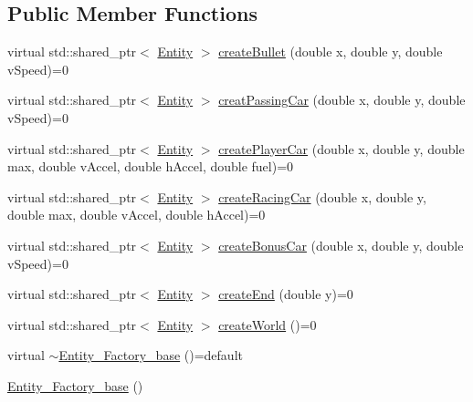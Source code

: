 \subsection*{Public Member Functions}
\begin{DoxyCompactItemize}
\item 
virtual std\+::shared\+\_\+ptr$<$ \hyperlink{classroadfighter_1_1Entity}{Entity} $>$ \hyperlink{classroadfighter_1_1Entity__Factory__base_a5241bdb886a9f1b086d009a0f6478045}{create\+Bullet} (double x, double y, double v\+Speed)=0
\item 
virtual std\+::shared\+\_\+ptr$<$ \hyperlink{classroadfighter_1_1Entity}{Entity} $>$ \hyperlink{classroadfighter_1_1Entity__Factory__base_aa21b8cb23696844b7349ccf2c87d10fa}{creat\+Passing\+Car} (double x, double y, double v\+Speed)=0
\item 
virtual std\+::shared\+\_\+ptr$<$ \hyperlink{classroadfighter_1_1Entity}{Entity} $>$ \hyperlink{classroadfighter_1_1Entity__Factory__base_a3021f69b62b9df33706096381664d58f}{create\+Player\+Car} (double x, double y, double max, double v\+Accel, double h\+Accel, double fuel)=0
\item 
virtual std\+::shared\+\_\+ptr$<$ \hyperlink{classroadfighter_1_1Entity}{Entity} $>$ \hyperlink{classroadfighter_1_1Entity__Factory__base_a17b9c30501b8a11624bee8f1c24a6b7e}{create\+Racing\+Car} (double x, double y, double max, double v\+Accel, double h\+Accel)=0
\item 
virtual std\+::shared\+\_\+ptr$<$ \hyperlink{classroadfighter_1_1Entity}{Entity} $>$ \hyperlink{classroadfighter_1_1Entity__Factory__base_a888f537d2deed2d90a391c1900e9fdb6}{create\+Bonus\+Car} (double x, double y, double v\+Speed)=0
\item 
virtual std\+::shared\+\_\+ptr$<$ \hyperlink{classroadfighter_1_1Entity}{Entity} $>$ \hyperlink{classroadfighter_1_1Entity__Factory__base_a791574991ccbe7ff95f28e5651ed2cb1}{create\+End} (double y)=0
\item 
virtual std\+::shared\+\_\+ptr$<$ \hyperlink{classroadfighter_1_1Entity}{Entity} $>$ \hyperlink{classroadfighter_1_1Entity__Factory__base_aa24de6bbeb80c25e96f3e24d6bcb5169}{create\+World} ()=0
\item 
virtual \hyperlink{classroadfighter_1_1Entity__Factory__base_a19ec21ceb4fd132712ef1bf131b4be9b}{$\sim$\+Entity\+\_\+\+Factory\+\_\+base} ()=default
\item 
\hyperlink{classroadfighter_1_1Entity__Factory__base_a2c498f47c9cae7c34052b3b10e0cb3d2}{Entity\+\_\+\+Factory\+\_\+base} ()
\item 

\end{DoxyCompactItemize}
